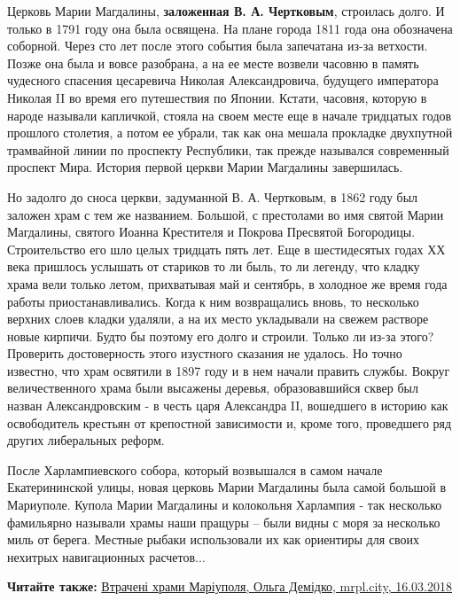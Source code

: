 
Церковь Марии Магдалины, \textbf{заложенная В. А. Чертковым}, строилась долго. И только в
1791 году она была освящена. На плане города 1811 года она обозначена соборной.
Через сто лет после этого события  была запечатана из-за ветхости. Позже она
была и вовсе разобрана, а на ее месте возвели часовню в память чудесного
спасения цесаревича Николая Александровича, будущего императора Николая II во
время его путешествия по Японии. Кстати, часовня, которую в народе называли
капличкой, стояла на своем месте еще в начале тридцатых годов прошлого
столетия, а потом ее убрали, так как она мешала прокладке двухпутной трамвайной
линии по проспекту Республики, так прежде назывался современный проспект Мира.
История первой церкви Марии Магдалины завершилась.


Но задолго до сноса церкви, задуманной В. А. Чертковым, в 1862 году был заложен
храм с тем же названием. Большой, с престолами во имя святой Марии Магдалины,
святого Иоанна Крестителя и Покрова Пресвятой Богородицы. Строительство его шло
целых тридцать пять лет. Еще в шестидесятых годах ХХ века пришлось услышать от
стариков то ли быль, то ли легенду, что кладку храма вели только летом,
прихватывая май и сентябрь, в холодное же время года работы приостанавливались.
Когда к ним возвращались вновь, то несколько верхних слоев кладки удаляли, а на
их место укладывали на свежем растворе новые кирпичи. Будто бы поэтому его
долго и строили. Только ли из-за этого? Проверить достоверность этого изустного
сказания не удалось. Но точно известно, что храм освятили в 1897 году и в нем
начали править службы. Вокруг величественного храма были высажены деревья,
образовавшийся сквер был назван Александровским - в честь царя Александра II,
вошедшего в историю как освободитель крестьян от крепостной зависимости и,
кроме того, проведшего ряд других либеральных реформ.

После Харлампиевского собора, который возвышался в самом начале Екатерининской
улицы, новая церковь Марии Магдалины была самой большой в Мариуполе. Купола
Марии Магдалины и колокольня Харлампия  - так несколько фамильярно называли
храмы наши пращуры – были видны с моря за несколько миль от берега. Местные
рыбаки использовали их как ориентиры для своих нехитрых навигационных расчетов...

\textbf{Читайте также:} \href{https://mrpl.city/blogs/view/vtracheni-hrami-mariupolya}{%
Втрачені храми Маріуполя, Ольга Демідко, mrpl.city, 16.03.2018}

